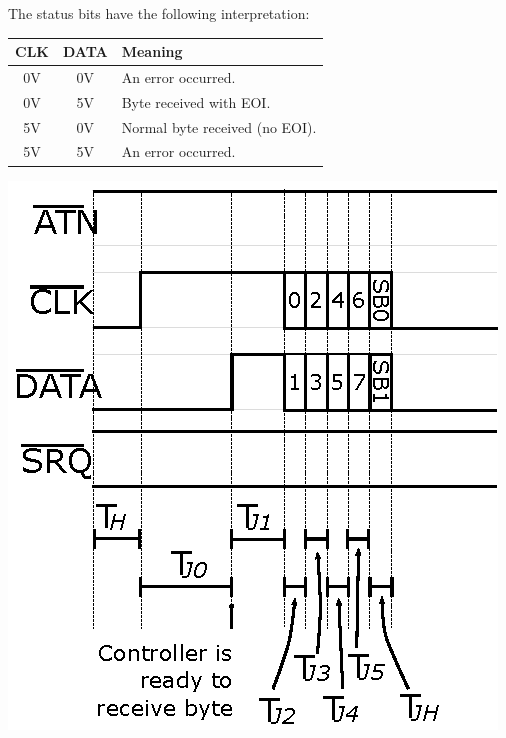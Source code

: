 The status bits have the following interpretation:

\begin{center}
    \begin{longtable}{|c|c|L{6cm}|}
      \hline
        \textbf{CLK} & \textbf{DATA} & \textbf{Meaning} \\
        \hline
        \endhead
        0V & 0V & An error occurred. \\
        \hline
        0V & 5V & Byte received with EOI. \\
        \hline
        5V & 0V & Normal byte received (no EOI). \\
        \hline
        5V & 5V & An error occurred. \\
        \hline
    \end{longtable}
\end{center}

\begin{center}
\includegraphics{images/IEC-Timing-Diagrams/IEC-Timing-Diagram-Receive-Byte-JD}
\end{center}

